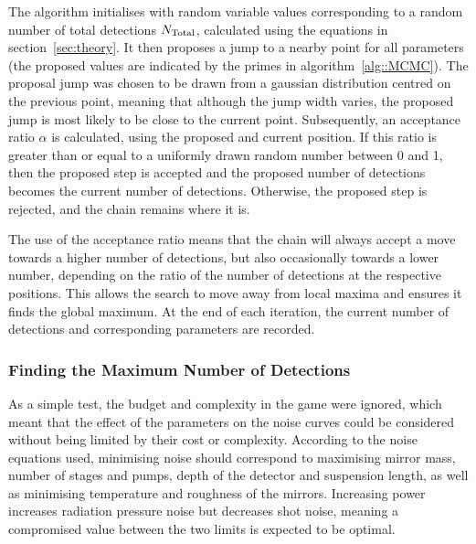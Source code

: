 \documentclass{article}
\begin{document}
The algorithm initialises with random variable values corresponding to
a random number of total detections $N_{\rm Total}$, calculated using the
equations in section~\ref{sec:theory}. It then proposes a jump to a
nearby point for all parameters (the proposed values are indicated by
the primes in algorithm~\ref{alg::MCMC}). The proposal jump was chosen
to be drawn from a gaussian distribution centred on the previous
point, meaning that although the jump width varies, the proposed jump
is most likely to be close to the current point. Subsequently, an
acceptance ratio $\alpha$ is calculated, using the proposed and
current position. If this ratio is greater than or equal to a
uniformly drawn random number between 0 and 1, then the proposed step
is accepted and the proposed number of detections becomes the current
number of detections. Otherwise, the proposed step is rejected, and
the chain remains where it is.

The use of the acceptance ratio means that the chain will always
accept a move towards a higher number of detections, but also
occasionally towards a lower number, depending on the ratio of the
number of detections at the respective positions. This allows the
search to move away from local maxima and ensures it finds the global
maximum. At the end of each iteration, the current number of
detections and corresponding parameters are recorded. 

\subsubsection*{Finding the Maximum Number of Detections}
As a simple test, the budget and complexity in the game were ignored,
which meant that the effect of the parameters on the noise curves
could be considered without being limited by their cost or
complexity. According to the noise equations used, minimising noise
should correspond to maximising mirror mass, number of stages and
pumps, depth of the detector and suspension length, as well as
minimising temperature and roughness of the mirrors. Increasing power
increases radiation pressure noise but decreases shot noise, meaning a
compromised value between the two limits is expected to be optimal. 
\end{document}

